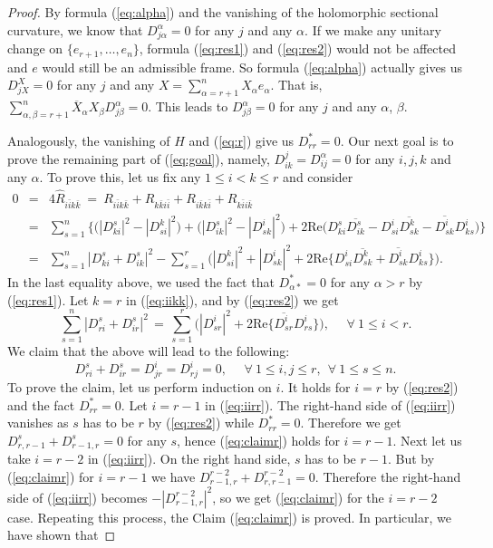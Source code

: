 \documentclass[10pt,a4paper]{amsart}
\begin{document}
\begin{proof}
By formula (\ref{eq:alpha}) and the vanishing of the holomorphic sectional curvature, we know that $D^{\alpha}_{j\alpha}=0$ for any $j$ and any $\alpha$. If we make any unitary change on $\{ e_{r\!+\!1},\ldots , e_n\}$, formula (\ref{eq:res1}) and (\ref{eq:res2}) would not be affected and $e$ would still be an admissible frame. So formula (\ref{eq:alpha}) actually gives us $D^{X}_{jX}=0$ for any $j$ and any $X=\sum_{\alpha =r\!+\!1}^n X_{\alpha}e_{\alpha}$. That is, $\sum_{\alpha ,\beta=r\!+\!1}^n \overline{X}_{\alpha} X_{\beta} D^{\alpha}_{j\beta }=0$. This leads to $D^{\alpha}_{j\beta}=0$ for any $j$ and any $\alpha$, $\beta$. 

Analogously, the vanishing of $H$ and (\ref{eq:r}) give us $D^{\ast}_{rr}=0$. Our next goal is to prove the remaining part of (\ref{eq:goal}), namely, 
$D^j_{ik}=D^{\alpha}_{ij}=0$ for any $ i$,\,$j$,\,$k$ and any $ \alpha$. To prove this, let us fix any $1\leq i<k\leq r$ and consider
\begin{eqnarray}
0 & = & 4\widehat{R}_{i\bar{i}k\bar{k}} \ = \ R_{i\bar{i}k\bar{k}} + R_{k\bar{k}i\bar{i}}  + R_{i\bar{k}k\bar{i}} +R_{k\bar{i}i\bar{k}} \nonumber \\
& = & \sum_{s=1}^n \{ \big( |D^s_{ki}|^2 -  |D^k_{si}|^2\big) + \big(|D^s_{ik}|^2 -  |D^i_{sk}|^2\big)  +2\mbox{Re}  \big( D^s_{ki}\overline{D^s_{ik}} - D^i_{si}\overline{D^k_{sk}} - \overline{D^i_{sk}} D^i_{ks} \big) \} \nonumber \\
& = & \sum_{s=1}^n |D^s_{ki}+D^s_{ik}|^2 -  \sum_{s=1}^r \big( |D^k_{si}|^2 + |D^i_{sk}|^2 + 2\mbox{Re} \{ D^i_{si}\overline{D^k_{sk}} + \overline{D^i_{sk}} D^i_{ks} \} \big). \label{eq:iikk}
\end{eqnarray}
In the last equality above, we used the fact that $D^{\ast}_{\alpha \ast}=0$ for any $\alpha >r$ by (\ref{eq:res1}). Let $k=r$ in (\ref{eq:iikk}), and by (\ref{eq:res2}) we get
\begin{equation}  \label{eq:iirr}
 \sum_{s=1}^n |D^s_{ri}+D^s_{ir}|^2 \, = \, \sum_{s=1}^r \big(  |D^i_{sr}|^2 + 2\mbox{Re} \{  \overline{D^i_{sr}} D^i_{rs} \} \big) , \ \ \ \ \ \ \forall \ 1\leq i<r.
 \end{equation}
We claim that the above will lead to the following:
\begin{equation}  \label{eq:claimr}
 D^s_{ri}+D^s_{ir}=D^i_{jr}=D^i_{rj}=0, \ \ \ \ \ \ \forall \ 1\leq i,j\leq r, \ \ \forall \ 1\leq s\leq n.
 \end{equation}
To prove the claim, let us perform induction on $i$. It holds for $i=r$ by (\ref{eq:res2}) and the fact $D^{\ast}_{rr}=0$. Let $i=r\!-\!1$ in (\ref{eq:iirr}). The right-hand side of (\ref{eq:iirr}) vanishes as $s$ has to be $r$ by (\ref{eq:res2}) while $D^{\ast}_{rr}=0$. Therefore we get $D^s_{r,r\!-\!1}+D^s_{r\!-\!1,r} =0$ for any $s$, hence (\ref{eq:claimr}) holds for $i=r\!-\!1$. Next let us take $i=r\!-\!2$ in (\ref{eq:iirr}). On the right hand side, $s$ has to be $r\!-\!1$. But by (\ref{eq:claimr}) for $i=r\!-\!1$ we have $D^{r\!-\!2}_{r\!-\!1,r} + D^{r\!-\!2}_{r,r\!-\!1}=0$. Therefore the right-hand side of (\ref{eq:iirr}) becomes $-| D^{r\!-\!2}_{r\!-\!1,r} |^2$, so we get (\ref{eq:claimr}) for the $i=r\!-\!2$ case. Repeating this process, the Claim (\ref{eq:claimr}) is proved. In particular, we have shown that

\end{proof}
\end{document}
